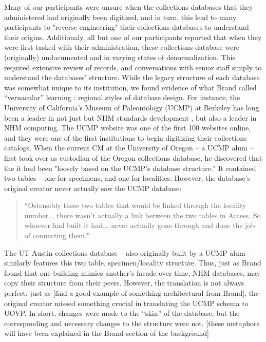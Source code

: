 Many of our participants were unsure when the collections databases that they administered had originally been digitized, and in turn, this lead to many participants to "reverse engineering" their collections databases to understand their origins. Additionaly, all but one of our participants reported that when they were first tasked with their administration, these collections database were (originally) undocumented and in varying states of denormalization. This required extensive review of records, and conversations with senior staff simply to understand the databases’ structure.  While the legacy structure of each database was somewhat unique to its institution, we found evidence of what Brand called “vernacular” learning \cite{brand1995buildings}: regional styles of database design. For instance, the University of California’s Museum of Paleontology (UCMP) at Berkeley has long been a leader in not just but NHM standards development \cite[][see]{Star_1989}, but also a leader in NHM computing. The UCMP website was one of the first 100 websites online, and they were one of the first institutions to begin digitizing their collections catalogs. When the current CM at the University of Oregon -- a UCMP alum -- first took over as custodian of the Oregon collections database, he discovered that the it had been "loosely based on the UCMP's database structure." It contained two tables -- one for specimens, and one for localities. However, the database’s original creator never actually saw the UCMP database:
\begin{quote}
“Ostensibly these two tables that would be linked through the locality number... there wasn't actually a link between the two tables in Access. So whoever had built it had... never actually gone through and done the job of connecting them."
\end{quote}
The UT Austin collections database – also originally built by a UCMP alum – similarly features this two table, specimen/locality structure. Thus, just as Brand found that one building mimics another’s facade over time, NHM databases, may copy their structure from their peers. However, the translation is not always perfect: just as [find a good example of something architectural from Brand], the original creator missed something crucial in translating the UCMP schema to UOVP. In short, changes were made to the “skin” of the database, but the corresponding and necessary changes to the structure were not. [these metaphors will have been explained in the Brand section of the background] 


